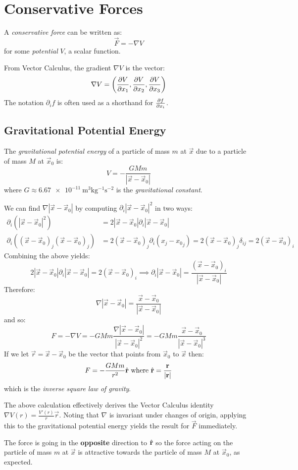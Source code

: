 \documentclass[../main.tex]{subfiles}
\begin{document}
\section{Conservative Forces}
\begin{definition}
  A \textit{conservative force} can be written as:
  \label{conservativeForce}
  \[
    \vec{F} = - \nabla V
  \]
  for some \textit{potential} $V$, a scalar function.
\end{definition}
\begin{remark}\par
  From Vector Calculus, the gradient $\nabla V$ is the vector:
  \[
    \nabla V = \left(\pderiv{V}{x_1}, \pderiv{V}{x_2}, \pderiv{V}{x_3}\right)
  \]
  The notation $\partial_i f$ is often used as a shorthand for $\pderiv{f}{x_i}$.
\end{remark}
\subsection{Gravitational Potential Energy}
\label{gravity}
The \textit{gravitational potential energy} of a particle of mass $m$ at $\vec{x}$ due to a particle of mass $M$ at $\vec{x}_0$ is:
\[
  V = - \frac{GMm}{|\vec{x} - \vec{x}_0|}
\]
where $G \approx \qty{6.67e-11}{\metre^3\kilogram^{-1}\second^{-2}}$ is the \textit{gravitational constant}.

We can find $\nabla|\vec{x} - \vec{x}_0|$ by computing $\partial_i|\vec{x} - \vec{x}_0|^2$ in two ways:
\begin{align*}
  \partial_i(|\vec{x} - \vec{x}_0|^2) &= 2|\vec{x} - \vec{x}_0|\partial_i|\vec{x} - \vec{x}_0| \\
  \partial_i((\vec{x} - \vec{x}_0)_j (\vec{x} - \vec{x}_0)_j) &= 2(\vec{x} - \vec{x}_0)_j \partial_i(x_j - {x_0}_j) = 2(\vec{x} - \vec{x}_0)_j \delta_{i j} = 2(\vec{x} - \vec{x}_0)_i
\end{align*}
Combining the above yields:
\[
  2|\vec{x} - \vec{x}_0|\partial_i |\vec{x} - \vec{x}_0| = 2(\vec{x} - \vec{x}_0)_i \implies  \partial_i|\vec{x} - \vec{x}_0| = \frac{(\vec{x} - \vec{x}_0)_i}{|\vec{x} - \vec{x}_0|}
\]
Therefore:
\[
  \nabla |\vec{x} - \vec{x}_0| = \frac{\vec{x} - \vec{x}_0}{|\vec{x} - \vec{x}_0|}
\]
and so:
\[
  F = - \nabla V = -GMm \frac{\nabla|\vec{x} - \vec{x}_0|}{|\vec{x} - \vec{x}_0|^2} = -GMm \frac{\vec{x} - \vec{x}_0}{|\vec{x} - \vec{x}_0|^3}
\]
If we let $\vec{r} = \vec{x} - \vec{x}_0$ be the vector that points from $\vec{x}_0$ to $\vec{x}$ then:
\[
  F = -\frac{GMm}{r^2} \hat{\mathbf{\bm{r}}} \text{ where } \hat{\mathbf{\bm{r}}} = \frac{\mathbf{\bm{r}}}{|\mathbf{\bm{r}}|}
\]
which is the \textit{inverse square law of gravity}.
\begin{remark}
  The above calculation effectively derives the Vector Calculus identity $\nabla V(r) = \frac{V'(r)}{r} \vec{r}$.
  Noting that $\nabla$ is invariant under changes of origin, applying this to the gravitational potential energy yields the result for $\vec{F}$ immediately.
\end{remark}
The force is going in the \textbf{opposite} direction to $\hat{\mathbf{\bm{r}}}$ so the force acting on the particle of mass $m$ at $\vec{x}$ is attractive towards the particle of mass $M$ at $\vec{x}_0$, as expected.
\end{document}
